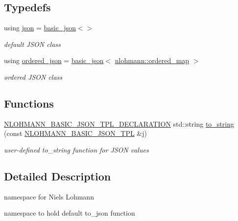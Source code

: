 \subsection*{Typedefs}
\begin{DoxyCompactItemize}
\item 
using \hyperlink{namespacenlohmann_a2bfd99e845a2e5cd90aeaf1b1431f474}{json} = \hyperlink{classnlohmann_1_1basic__json}{basic\+\_\+json}$<$$>$
\begin{DoxyCompactList}\small\item\em default J\+S\+ON class \end{DoxyCompactList}\item 
using \hyperlink{namespacenlohmann_ad53cef358adfa7f07cea23eb1e28b9ea}{ordered\+\_\+json} = \hyperlink{classnlohmann_1_1basic__json}{basic\+\_\+json}$<$ \hyperlink{structnlohmann_1_1ordered__map}{nlohmann\+::ordered\+\_\+map} $>$
\begin{DoxyCompactList}\small\item\em ordered J\+S\+ON class \end{DoxyCompactList}\end{DoxyCompactItemize}
\subsection*{Functions}
\begin{DoxyCompactItemize}
\item 
\hyperlink{json_8hpp_a0643bd74c2dc6f0e4e420b8190ea8f0f}{N\+L\+O\+H\+M\+A\+N\+N\+\_\+\+B\+A\+S\+I\+C\+\_\+\+J\+S\+O\+N\+\_\+\+T\+P\+L\+\_\+\+D\+E\+C\+L\+A\+R\+A\+T\+I\+ON} std\+::string \hyperlink{namespacenlohmann_a6ce645a0b8717757e096a5b5773b7a16}{to\+\_\+string} (const \hyperlink{json_8hpp_a80b7254e63f199a1f656f07ae551f632}{N\+L\+O\+H\+M\+A\+N\+N\+\_\+\+B\+A\+S\+I\+C\+\_\+\+J\+S\+O\+N\+\_\+\+T\+PL} \&j)
\begin{DoxyCompactList}\small\item\em user-\/defined to\+\_\+string function for J\+S\+ON values \end{DoxyCompactList}\end{DoxyCompactItemize}


\subsection{Detailed Description}
namespace for Niels Lohmann 

namespace to hold default {\ttfamily to\+\_\+json} function

